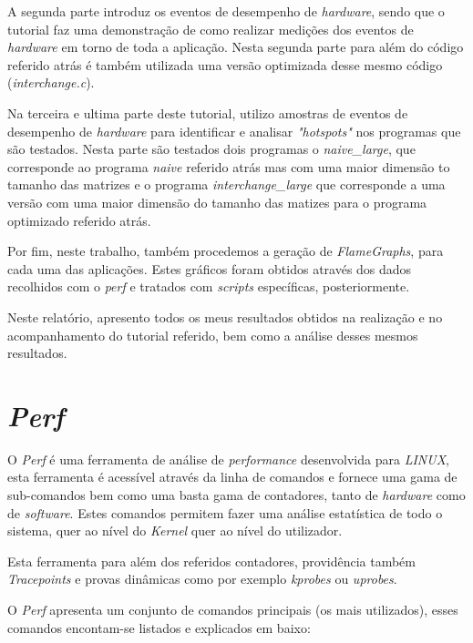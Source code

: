 \documentclass[conference,compsoc]{IEEEtran}
\begin{document}
A segunda parte introduz os eventos de desempenho de \textit{hardware}, sendo que o tutorial faz uma demonstração de como realizar medições dos eventos de \textit{hardware} em torno de toda a aplicação. Nesta segunda parte para além do código referido atrás é também utilizada uma versão optimizada desse mesmo código (\textit{interchange.c}).

Na terceira e ultima parte deste  tutorial, utilizo amostras de eventos de desempenho de \textit{hardware} para identificar e analisar \textit{"hotspots"} nos programas que são testados. Nesta parte são testados dois programas o \textit{naive\_large}, que corresponde ao programa \textit{naive} referido atrás mas com uma maior dimensão to tamanho das matrizes e o programa \textit{interchange\_large} que corresponde a uma versão com uma maior dimensão do tamanho das matizes para o programa optimizado referido atrás.

Por fim, neste trabalho, também procedemos a geração de \textit{FlameGraphs}, para cada uma das aplicações. Estes gráficos foram obtidos através dos dados recolhidos com o \textit{perf} e tratados com \textit{scripts} específicas, posteriormente.

Neste relatório, apresento todos os meus resultados obtidos na realização e no acompanhamento do tutorial referido, bem como a análise desses mesmos resultados.

\section{\textit{Perf}}
O \textit{Perf} é uma ferramenta de análise de \textit{performance} desenvolvida para \textit{LINUX}, esta ferramenta é acessível através da linha de comandos e fornece uma gama de sub-comandos bem como uma basta gama de contadores, tanto de \textit{hardware} como de \textit{software}. Estes comandos permitem fazer uma análise estatística de todo o sistema, quer ao nível do \textit{Kernel} quer ao nível do utilizador.

Esta ferramenta para além dos referidos contadores, providência também \textit{Tracepoints} e provas dinâmicas como por exemplo \textit{kprobes} ou \textit{uprobes}.

O \textit{Perf} apresenta um conjunto de comandos principais (os mais utilizados), esses comandos encontam-se listados e explicados em baixo:
\end{document}
